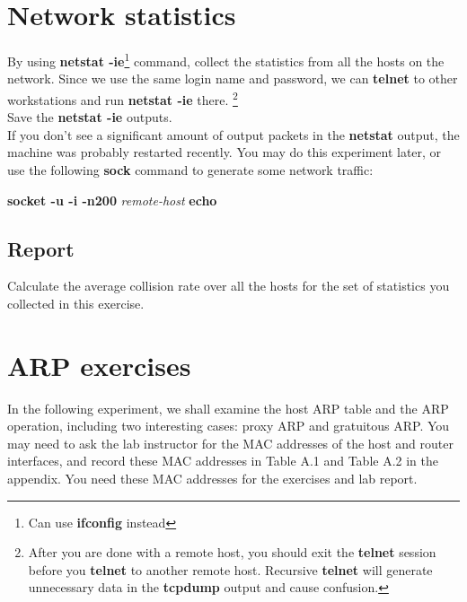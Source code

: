 \documentclass[10pt,a4paper]{article}
\numberwithin{equation}{section}
\numberwithin{figure}{section}
\numberwithin{table}{section}
\begin{document}
\section{Network statistics}
    By using \textbf{netstat -ie}\footnote{Can use \textbf{ifconfig} instead} command, collect the statistics from all the hosts on the network.
    Since we use the same login name and password, we can \textbf{telnet} to other workstations and run \textbf{netstat -ie} there. \footnote{After you are done with a remote host, you should exit the \textbf{telnet} session before you \textbf{telnet} to another remote host.
    Recursive \textbf{telnet} will generate unnecessary data in the \textbf{tcpdump} output and cause confusion.} \\
    Save the \textbf{netstat -ie} outputs. \\
    If you don’t see a significant amount of output packets in the \textbf{netstat} output, the machine was probably restarted recently. You may do this experiment later, or use the following \textbf{sock} command to generate some network traffic: \\
    \centerline{\textbf{socket -u -i -n200} \textit{remote-host} \textbf{echo}}
    \subsection*{Report}
    Calculate the average collision rate over all the hosts for the set of statistics you collected in this exercise.

\section*{ARP exercises}
    In the following experiment, we shall examine the host ARP table and the ARP operation, including two interesting cases: proxy ARP and gratuitous ARP. You may need to ask the lab instructor for the MAC addresses of the host and router interfaces, and record these MAC addresses in Table A.1 and Table A.2 in the appendix.
    You need these MAC addresses for the exercises and lab report.
\end{document}
